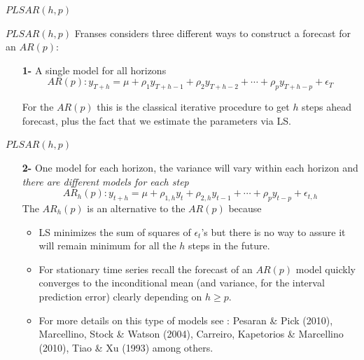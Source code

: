 \documentclass{beamer}
\newcommand{\?}{?`}
\begin{document}
\begin{frame}{}
  \begin{block}{}
    \begin{center}
      \vspace{3mm}
      {\Large $PLSAR(h,p)$}
      \vspace{3mm}
    \end{center}
  \end{block}
\end{frame}

\begin{frame}{$PLSAR(h,p)$}
  Franses considers three different ways to construct a forecast for an $AR(p)$:
  \bigskip
  \begin{itemize}
    \item[\textbf{1-}] A single model for all horizons
      \begin{displaymath}
        AR(p): y_{T+h}=\mu+
        \rho_1y_{T+h-1}+\rho_2y_{T+h-2}+\cdots + \rho_py_{T+h-p} + \epsilon_T
      \end{displaymath}

      For the $AR(p)$ this is the classical iterative procedure to get $h$
      steps ahead forecast, plus the fact that we estimate the parameters via LS.
  \end{itemize}
\end{frame}

\begin{frame}{$PLSAR(h,p)$}
  \begin{itemize}
  \item[\textbf{2-}] One model for each horizon, the variance will vary within each horizon and {\it{there are different models for each step}}
    \begin{displaymath}
      AR_h(p): y_{t+h}=\mu+
      \rho_{1,h}y_{t}+\rho_{2,h}y_{t-1}+\cdots + \rho_py_{t-p}+\epsilon_{t,h}
    \end{displaymath}
    The $AR_h(p)$  is an alternative to the $AR(p)$ because
    \begin{itemize}
    \item LS minimizes the sum of squares of $\epsilon_t$'s  but there is no way to assure it will remain minimum for all the $h$ steps in the future.
    \item For stationary time series recall the forecast of an  $AR(p)$ model quickly converges to the inconditional mean
    (and variance, for the interval prediction error) clearly depending on
    $h\geq p$.
    \item For more details on this type of models see : Pesaran \& Pick (2010), Marcellino, Stock \& Watson (2004),
    Carreiro, Kapetorios \& Marcellino (2010), Tiao \& Xu (1993) among others.
    \end{itemize}
  \end{itemize}
\end{frame}
\end{document}
